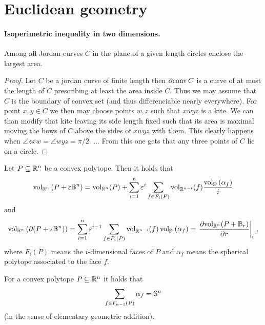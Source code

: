\documentclass[8pt,a4paper]{article}
\begin{document}
\section{Euclidean geometry}

\paragraph{Isoperimetric inequality in two dimensions.}

\begin{lemma}
    Among all Jordan curves $C$ in the plane of a given length circles enclose the largest area.
\end{lemma}

\begin{proof}
    Let $C$ be a jordan curve of finite length then $\partial{\mathop\mathrm{conv}{C}}$ is a curve of at most the length of $C$ prescribing at least the area inside $C$.
    Thus we may assume that $C$ is the boundary of convex set (and thus differenciable nearly everywhere). For point $x,y \in C$ we then may choose points $w,z$ such that $xwyz$ is a kite. We can than modify that kite leaving its side length fixed such that its area is maximal moving the bows of $C$ above the sides of $xwyz$ with them. This clearly happens when $\angle zxw=\angle wyz=\pi/2$. ... From this one gets that any three points of $C$ lie on a circle.
\end{proof}


\begin{lemma}
    Let $P\subseteq \mathbb{R}^n$ be a convex polytope. Then it holds that
    $$
    \mathop\mathrm{vol}\nolimits_{\mathbb{R}^n}{(P+\varepsilon\mathbb{B}^n)}=\mathop\mathrm{vol}\nolimits_{\mathbb{R}^n}(P)+\sum_{i=1}^n{\varepsilon^i\sum_{f\in F_i(P)}{\mathop\mathrm{vol}\nolimits_{\mathbb{R}^{n-i}}(f)\frac{\mathop\mathrm{vol}\nolimits_{\mathbb{S}^i}(\alpha_f)}{i}}}
    $$
    and
    $$
    \mathop\mathrm{vol}\nolimits_{\mathbb{R}^n}{(\partial(P+\varepsilon\mathbb{B}^n))}=\sum_{i=1}^{n}{\varepsilon^{i-1}\sum_{f\in F_i(P)}{\mathop\mathrm{vol}\nolimits_{\mathbb{R}^{n-i}}(f)\mathop\mathrm{vol}\nolimits_{\mathbb{S}^i}(\alpha_f)}}=\left. \frac{\partial{\mathop\mathrm{vol}\nolimits_{\mathbb{R}^n}(P+\mathbb{B}_r)}}{\partial{r}}\right\vert_{\varepsilon},
    $$
    where $F_i(P)$ means the $i$-dimensional faces of $P$ and $\alpha_f$ means the spherical polytope associated to the face $f$.
\end{lemma}

\begin{lemma}
    For a convex polytope $P\subseteq\mathbb{R}^n$ it holds that
    $$
    \sum_{f\in F_{n-1}(P)}\alpha_f=\mathbb{S}^n
    $$
    (in the sense of elementary geometric addition).
\end{lemma}
\end{document}
